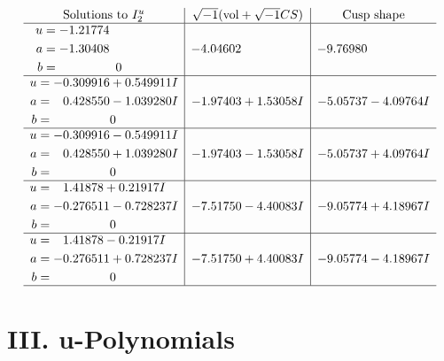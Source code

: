 \documentclass[1p]{elsarticle_modified}
\theoremstyle{definition}
\newcommand{\I}{\sqrt{-1}}
\begin{document}
$$\begin{array}{c|c|c}  
\text{Solutions to }I^u_{2}& \I (\text{vol} + \sqrt{-1}CS) & \text{Cusp shape}\\
 \hline 
\begin{aligned}
u &= -1.21774\phantom{ +0.000000I} \\
a &= -1.30408\phantom{ +0.000000I} \\
b &= \phantom{-0.000000 } 0\end{aligned}
 & -4.04602\phantom{ +0.000000I} & -9.76980\phantom{ +0.000000I} \\ \hline\begin{aligned}
u &= -0.309916 + 0.549911 I \\
a &= \phantom{-}0.428550 - 1.039280 I \\
b &= \phantom{-0.000000 } 0\end{aligned}
 & -1.97403 + 1.53058 I & -5.05737 - 4.09764 I \\ \hline\begin{aligned}
u &= -0.309916 - 0.549911 I \\
a &= \phantom{-}0.428550 + 1.039280 I \\
b &= \phantom{-0.000000 } 0\end{aligned}
 & -1.97403 - 1.53058 I & -5.05737 + 4.09764 I \\ \hline\begin{aligned}
u &= \phantom{-}1.41878 + 0.21917 I \\
a &= -0.276511 - 0.728237 I \\
b &= \phantom{-0.000000 } 0\end{aligned}
 & -7.51750 - 4.40083 I & -9.05774 + 4.18967 I \\ \hline\begin{aligned}
u &= \phantom{-}1.41878 - 0.21917 I \\
a &= -0.276511 + 0.728237 I \\
b &= \phantom{-0.000000 } 0\end{aligned}
 & -7.51750 + 4.40083 I & -9.05774 - 4.18967 I\\
 \hline 
 \end{array}$$\newpage
\newpage\renewcommand{\arraystretch}{1}
\centering \section*{ III. u-Polynomials}
\end{document}

